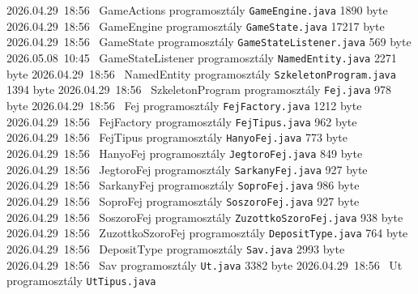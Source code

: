 \begin{fajllista}
    {2026.04.29~18:56~} %
    {GameActions programosztály} %
    \fajl
    {\texttt{GameEngine.java}} %
    {1890 byte} %
    {2026.04.29~18:56~} %
    {GameEngine programosztály} %
    \fajl
    {\texttt{GameState.java}} %
    {17217 byte} %
    {2026.04.29~18:56~} %
    {GameState programosztály} %
    \fajl
    {\texttt{GameStateListener.java}} %
    {569 byte} %
    {2026.05.08~10:45~} %
    {GameStateListener programosztály} %
    \fajl
    {\texttt{NamedEntity.java}} %
    {2271 byte} %
    {2026.04.29~18:56~} %
    {NamedEntity programosztály} %
    \fajl
    {\texttt{SzkeletonProgram.java}} %
    {1394 byte} %
    {2026.04.29~18:56~} %
    {SzkeletonProgram programosztály} %
    \fajl
    {\texttt{Fej.java}} %
    {978 byte} %
    {2026.04.29~18:56~} %
    {Fej programosztály} %
    \fajl
    {\texttt{FejFactory.java}} %
    {1212 byte} %
    {2026.04.29~18:56~} %
    {FejFactory programosztály} %
    \fajl
    {\texttt{FejTipus.java}} %
    {962 byte} %
    {2026.04.29~18:56~} %
    {FejTipus programosztály} %
    \fajl
    {\texttt{HanyoFej.java}} %
    {773 byte} %
    {2026.04.29~18:56~} %
    {HanyoFej programosztály} %
    \fajl
    {\texttt{JegtoroFej.java}} %
    {849 byte} %
    {2026.04.29~18:56~} %
    {JegtoroFej programosztály} %
    \fajl
    {\texttt{SarkanyFej.java}} %
    {927 byte} %
    {2026.04.29~18:56~} %
    {SarkanyFej programosztály} %
    \fajl
    {\texttt{SoproFej.java}} %
    {986 byte} %
    {2026.04.29~18:56~} %
    {SoproFej programosztály} %
    \fajl
    {\texttt{SoszoroFej.java}} %
    {927 byte} %
    {2026.04.29~18:56~} %
    {SoszoroFej programosztály} %
    \fajl
    {\texttt{ZuzottkoSzoroFej.java}} %
    {938 byte} %
    {2026.04.29~18:56~} %
    {ZuzottkoSzoroFej programosztály} %
    \fajl
    {\texttt{DepositType.java}} %
    {764 byte} %
    {2026.04.29~18:56~} %
    {DepositType programosztály} %
    \fajl
    {\texttt{Sav.java}} %
    {2993 byte} %
    {2026.04.29~18:56~} %
    {Sav programosztály} %
    \fajl
    {\texttt{Ut.java}} %
    {3382 byte} %
    {2026.04.29~18:56~} %
    {Ut programosztály} %
    \fajl
    {\texttt{UtTipus.java}} %

\end{fajllista}
